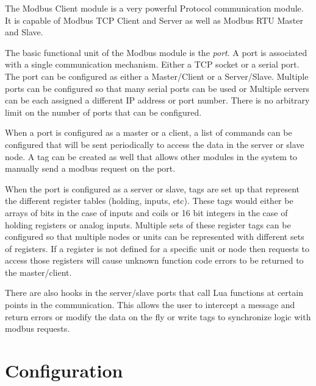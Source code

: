 The Modbus Client module is a very powerful \modbus{} Protocol communication module.
It is capable of Modbus TCP Client and Server as well as Modbus RTU Master and
Slave.

The basic functional unit of the Modbus module is the \textit{port}.  A port is
associated with a single communication mechanism.  Either a TCP socket or a serial
port.  The port can be configured as either a Master/Client or a Server/Slave.
Multiple ports can be configured so that many serial ports can be used or Multiple
servers can be each assigned a different IP address or port number.  There is no
arbitrary limit on the number of ports that can be configured.

When a port is configured as a master or a client, a list of commands can be
configured that will be sent periodically to access the data in the server or
slave node.  A tag can be created as well that allows other modules in the
system to manually send a modbus request on the port.

When the port is configured as a server or slave, tags are set up that represent
the different register tables (holding, inputs, etc).  These tags would either be arrays
of bits in the case of inputs and coils or 16 bit integers in the case of holding
registers or analog inputs.  Multiple sets of these register tags can be configured
so that multiple nodes or units can be represented with different sets of registers.
If a register is not defined for a specific unit
or node then requests to access those registers will cause unknown function code
errors to be returned to the master/client.

There are also hooks in the server/slave ports that call Lua functions at certain
points in the communication.  This allows the user to intercept a message and
return errors or modify the data on the fly or write tags to synchronize
logic with modbus requests.


\section{Configuration}

